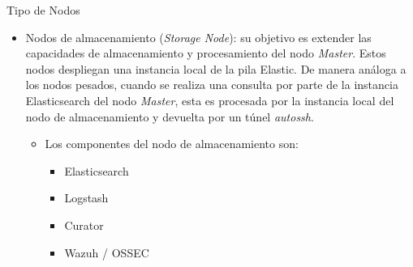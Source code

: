 \begin{subsubsection}{Tipo de Nodos}
\begin{itemize}
\begin{itemize}
\begin{itemize}
                    \item Curator
                    \item Zeek
                    \item Snort / Suricata
                    \item Netsniff-ng
                    \item Wazuh / OSSEC
                    \item Syslog-ng (envía los logs a la instancia local de Logstash)
                \end{itemize}
            \end{itemize}
            \item Nodos de almacenamiento (\textit{Storage Node}): su objetivo es extender las capacidades de almacenamiento y procesamiento del nodo \textit{Master}. Estos nodos despliegan una instancia local de la pila Elastic. De manera análoga a los nodos pesados, cuando se realiza una consulta por parte de la instancia Elasticsearch del nodo \textit{Master}, esta es procesada por la instancia local del nodo de almacenamiento y devuelta por un túnel \textit{autossh}.
            \begin{itemize}
                \item Los componentes del nodo de almacenamiento son:
                \begin{itemize}
                    \item Elasticsearch
                    \item Logstash
                    \item Curator
                    \item Wazuh / OSSEC
                \end{itemize}
            \end{itemize}
        \end{itemize}
    \end{subsubsection}
    \pagebreak
